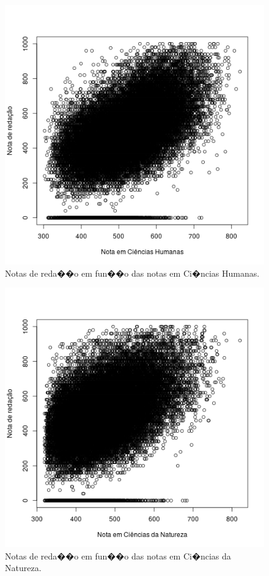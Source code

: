 \documentclass[12pt]{article}
\begin{document}
\begin{minipage}{.5\textwidth}
    \begin{figure}[H]
    \centering\includegraphics[width=.86\linewidth]{../correlacao_nota_ch.png}
    \caption{Notas de reda��o em fun��o das notas em Ci�ncias Humanas.}
    \label{fig:correlacao-nota-ch}
    \end{figure}
\end{minipage}%
\begin{minipage}{.5\textwidth}
    \begin{figure}[H]
    \centering\includegraphics[width=.86\linewidth]{../correlacao_nota_cn.png}
    \caption{Notas de reda��o em fun��o das notas em Ci�ncias da Natureza.}
    \label{fig:correlacao-nota-cn}
    \end{figure}
\end{minipage}
\end{document}
